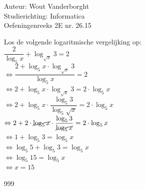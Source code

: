\documentclass[a4paper]{article}
\begin{document}
  
\noindent \large Auteur: Wout Vanderborght\\
\noindent \large Studierichting: Informatica\\
\noindent \large Oefeningenreeks 2E nr. 26.15\\

\medskip

\normalsize

Los de volgende logaritmische vergelijking op: \\

$ \dfrac{2}{\log_5 x} + \log_{\sqrt{x}} 3 = 2 $ \\

$ \Leftrightarrow \dfrac{2 + \log_5 x \cdot \log_{\sqrt{x}} 3}{\log_5 x} = 2 $ \\

$ \Leftrightarrow 2 + \log_5 x \cdot \log_{\sqrt{x}} 3 = 2 \cdot \log_5 x $ \\

$ \Leftrightarrow 2 + \log_5 x \cdot \dfrac{\log_5 3}{\log_5 \sqrt{x}} = 2 \cdot \log_5 x $ \\

$ \Leftrightarrow 2 + 2 \cdot \cancel{\log_5 x} \cdot \dfrac{\log_5 3}{\cancel{\log_5 x}} = 2 \cdot \log_5 x $ \\

$ \Leftrightarrow 1 + \log_5 3 = \log_5 x $ \\

$ \Leftrightarrow \log_5 5 + \log_5 3 = \log_5 x $ \\

$ \Leftrightarrow \log_5 15 = \log_5 x $ \\

$ \Leftrightarrow x = 15 $ \\

\begin{thebibliography}{999}
\end{thebibliography}
\end{document}
